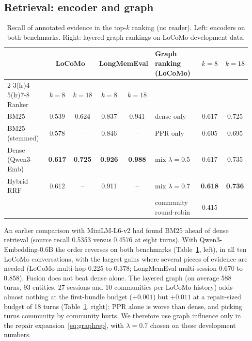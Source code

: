 \documentclass[10pt]{article}
\theoremstyle{plain}
\theoremstyle{definition}
\begin{document}
\subsection{Retrieval: encoder and graph}
\label{sec:retrieval}

\begin{table}[t]
\centering
\caption{Recall of annotated evidence in the top-$k$ ranking (no reader). Left: encoders on both
benchmarks. Right: layered-graph rankings on LoCoMo development data.}
\label{tab:retrieval}
\small
\begin{tabular}{lcccc@{\hspace{14pt}}lcc}
\toprule
 & \multicolumn{2}{c}{LoCoMo} & \multicolumn{2}{c}{LongMemEval} & Graph ranking (LoCoMo) & $k{=}8$ & $k{=}18$ \\
\cmidrule(lr){2-3}\cmidrule(lr){4-5}\cmidrule(lr){7-8}
Ranker & $k{=}8$ & $k{=}18$ & $k{=}8$ & $k{=}18$ & & & \\
\midrule
BM25 & 0.539 & 0.624 & 0.837 & 0.941 & dense only & 0.617 & 0.725 \\
BM25 (stemmed) & 0.578 & -- & 0.846 & -- & PPR only & 0.605 & 0.695 \\
Dense (Qwen3-Emb) & \textbf{0.617} & \textbf{0.725} & \textbf{0.926} & \textbf{0.988} & mix $\lambda{=}0.5$ & 0.617 & 0.735 \\
Hybrid RRF & 0.612 & -- & 0.911 & -- & mix $\lambda{=}0.7$ & \textbf{0.618} & \textbf{0.736} \\
 & & & & & community round-robin & 0.415 & -- \\
\bottomrule
\end{tabular}
\end{table}

An earlier comparison with MiniLM-L6-v2 had found BM25 ahead of dense retrieval (source recall 0.5353
versus 0.4576 at eight turns). With Qwen3-Embedding-0.6B the order reverses on both benchmarks
(Table~\ref{tab:retrieval}, left), in all ten LoCoMo conversations, with the largest gains where several
pieces of evidence are needed (LoCoMo multi-hop 0.225 to 0.378; LongMemEval multi-session 0.670 to
0.858). Fusion does not beat dense alone. The layered graph (on average 588 turns, 93 entities, 27
sessions and 10 communities per LoCoMo history) adds almost nothing at the first-bundle budget
($+0.001$) but $+0.011$ at a repair-sized budget of 18 turns (Table~\ref{tab:retrieval}, right); PPR alone
is worse than dense, and picking turns community by community hurts. We therefore use graph influence
only in the repair expansion~\eqref{eq:graphrep}, with $\lambda=0.7$ chosen on these development numbers.
\end{document}
